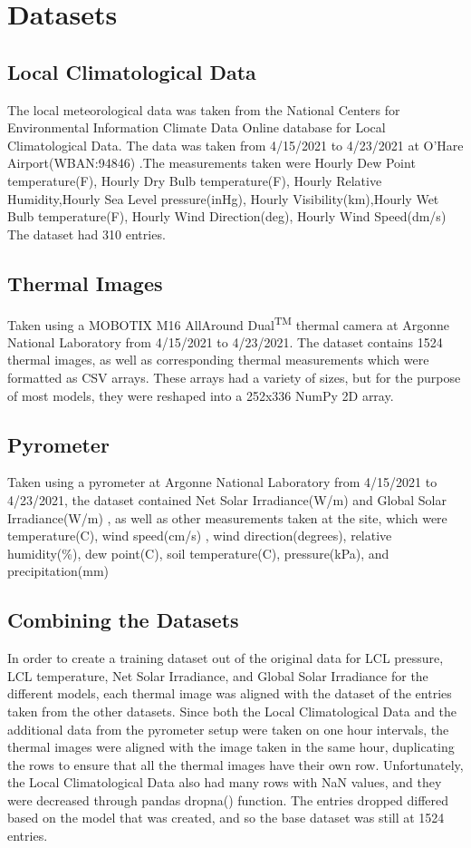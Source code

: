 \documentclass[conference]{IEEEtran}
\begin{document}
\section{Datasets}
\subsection{Local Climatological Data}
The local meteorological data was taken from the National Centers for Environmental Information Climate Data Online database for Local Climatological Data. The data was taken from 4/15/2021 to 4/23/2021 at O'Hare Airport(WBAN:94846)
.The measurements taken were Hourly Dew Point temperature(F), Hourly Dry Bulb temperature(F), Hourly Relative Humidity,Hourly Sea Level pressure(inHg), Hourly Visibility(km),Hourly Wet Bulb temperature(F), Hourly Wind Direction(deg),
 Hourly Wind Speed(dm/s)
The dataset had 310 entries.
\subsection{Thermal Images}
Taken using a MOBOTIX M16 AllAround Dual\textsuperscript{TM} thermal camera at Argonne National Laboratory from 4/15/2021 to 4/23/2021. The dataset contains 1524 thermal images, as well as corresponding thermal measurements which were
formatted as CSV arrays. These arrays had a variety of sizes, but for the purpose of most models, they were reshaped into a 252x336 NumPy 2D array.
\subsection{Pyrometer}
Taken using a pyrometer at Argonne National Laboratory from 4/15/2021 to 4/23/2021, the dataset contained Net Solar Irradiance(W/m) and Global Solar Irradiance(W/m) , as well as other measurements taken at the site, which were temperature(C), wind speed(cm/s)
, wind direction(degrees), relative humidity(\%), dew point(C), soil temperature(C), pressure(kPa), and precipitation(mm)
\subsection{Combining the Datasets}
In order to create a training dataset  out of the original data for LCL pressure, LCL temperature, Net Solar Irradiance, and Global Solar Irradiance for the different models, each thermal image was aligned with the dataset of the entries taken from the other datasets.
Since both the Local Climatological Data and the additional data from the pyrometer setup were taken on one hour intervals, the thermal images were aligned with the image taken in the same hour, duplicating the rows to ensure that all the thermal images have their own row. Unfortunately, the Local Climatological Data also had many rows with NaN values, and they were decreased through pandas dropna() function. The entries dropped differed based on the model that was created, and so the base 
dataset was still at 1524 entries.
\end{document}

